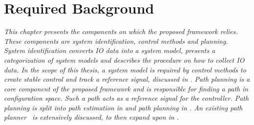 \chapter{Required Background}%
\label{chap:required_background}
\textit{This chapter presents the components on which the proposed framework relies. These components are system identification, control methods and planning. System identification converts \ac{IO} data into a system model,  presents a categorization of system models and describes the procedure on how to collect \ac{IO} data. In the scope of this thesis, a system model is required by control methods to create stable control and track a reference signal, discussed in . Path planning is a core component of the proposed framework and is responsible for finding a path in configuration space. Such a path acts as a reference signal for the controller. Path planning is split into path estimation in  and path planning in . An existing path planner~\cite{wang_affordancebased_2020} is extensively discussed, to then expand upon in .\bs}

% 



